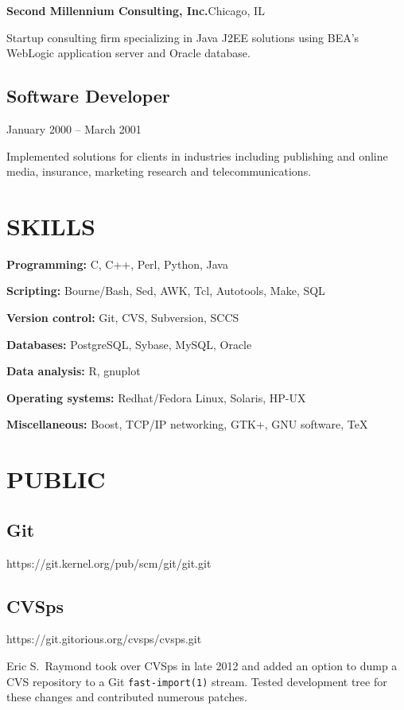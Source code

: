 {\vskip 20pt

{\bf Second Millennium Consulting, Inc.}\quad Chicago, IL

Startup consulting firm specializing in Java J2EE solutions using BEA's
WebLogic application server and Oracle database.

\vskip 5pt
\subsection{Software Developer}
    {January 2000 -- March 2001}

Implemented solutions for clients in industries including publishing and
online media, insurance, marketing research and telecommunications.

}

\section{SKILLS}{%
{\bf Programming:} C, C++, Perl, Python, Java

{\bf Scripting:} Bourne/Bash, Sed, AWK, Tcl, Autotools, Make, SQL

{\bf Version control:} Git, CVS, Subversion, SCCS

{\bf Databases:} PostgreSQL, Sybase, MySQL, Oracle

{\bf Data analysis:} R, gnuplot

{\bf Operating systems:} Redhat/Fedora Linux, Solaris, HP-UX

{\bf Miscellaneous:} Boost, TCP/IP networking, GTK+, GNU software, \TeX
}

\section{PUBLIC}{%
\parskip=3pt
\subsection{Git}        {\tb https://git.kernel.org/pub/scm/git/git.git}




\vskip 8pt

\subsection{CVSps}       {\tb https://git.gitorious.org/cvsps/cvsps.git}

Eric S.\ Raymond took over CVSps in late 2012 and added an option to
dump a CVS repository to a Git {\tt fast-import(1)} stream.  Tested
development tree for these changes and contributed numerous patches.

}

